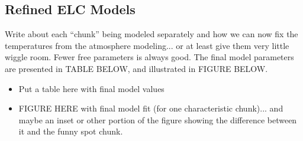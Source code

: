 \subsection{Refined ELC Models}
Write about each ``chunk'' being modeled separately and how we can now fix the temperatures from the atmosphere modeling... or at least give them very little wiggle room. Fewer free parameters is always good.
The final model parameters are presented in TABLE BELOW, and illustrated in FIGURE BELOW.

\begin{itemize}
\item Put a table here with final model values
\item FIGURE HERE with final model fit (for one characteristic chunk)... and maybe an inset or other portion of the figure showing the difference between it and the funny spot chunk.
\end{itemize}